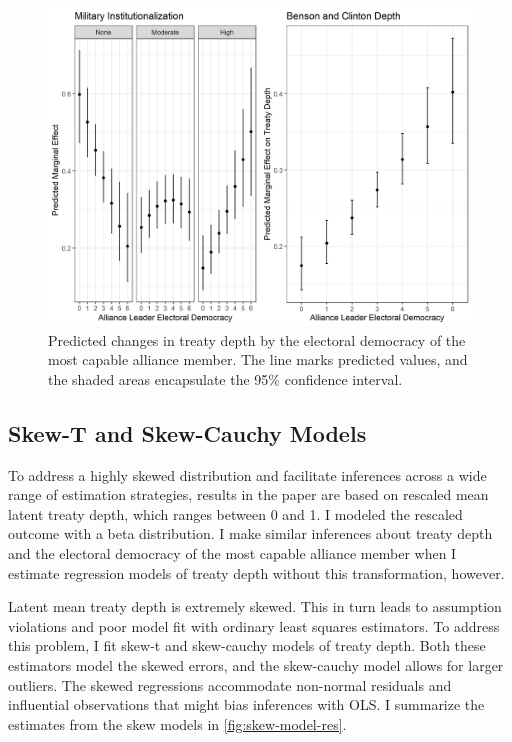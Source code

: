 \documentclass[12pt]{article}
\begin{document}
\begin{figure}
\includegraphics[width=.95\textwidth]{results-alt-measures-sep.png}  
\caption{Predicted changes in treaty depth by the electoral democracy of the most capable alliance member. The line marks predicted values, and the shaded areas encapsulate the 95\% confidence interval.}
\label{fig:results-alt-measures-sep}
\end{figure}



\subsection{Skew-T and Skew-Cauchy Models}

To address a highly skewed distribution and facilitate inferences across a wide range of estimation strategies, results in the paper are based on rescaled mean latent treaty depth, which ranges between 0 and 1. 
I modeled the rescaled outcome with a beta distribution. 
I make similar inferences about treaty depth and the electoral democracy of the most capable alliance member when I estimate regression models of treaty depth without this transformation, however. 


Latent mean treaty depth is extremely skewed. 
This in turn leads to assumption violations and poor model fit with ordinary least squares estimators. 
To address this problem, I fit skew-t and skew-cauchy models of treaty depth.
Both these estimators model the skewed errors, and the skew-cauchy model allows for larger outliers.   
The skewed regressions accommodate non-normal residuals and influential observations that might bias inferences with OLS. 
I summarize the estimates from the skew models in \autoref{fig:skew-model-res}. 
\end{document}
